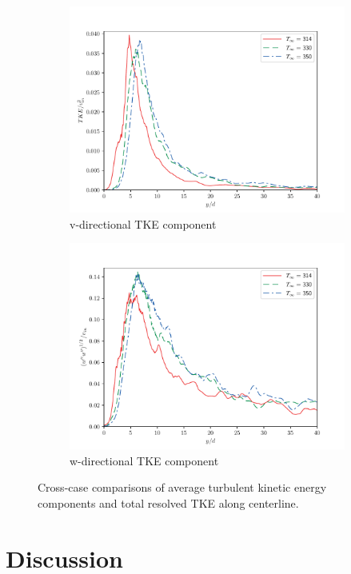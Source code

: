 \begin{figure}[H]
\begin{center}
\begin{subfigure}{0.45\textwidth}
	\includegraphics[scale=.45]{figures/Plots/centerline/TKE_centerline.pdf}
	\caption{v-directional TKE component} \label{v_fa_1}
\end{subfigure}
\begin{subfigure}{0.45\textwidth}
	\includegraphics[scale=.45]{figures/Plots/centerline/w_fa_centerline.pdf}
	\caption{w-directional TKE component} \label{w_fa_1}
\end{subfigure}
\caption{Cross-case comparisons of average turbulent kinetic energy components and total resolved TKE along centerline.}
\label{noniso_TKE_features}
\end{center}
\end{figure}



\section{Discussion}





